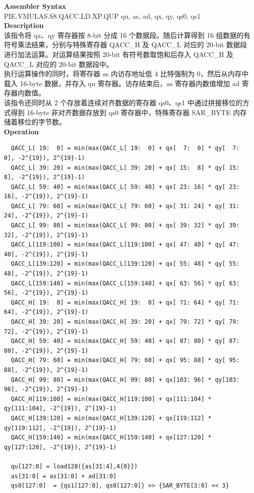 \textbf{Assembler Syntax} \\
PIE.VMULAS.S8.QACC.LD.XP.QUP qu, as, ad, qx, qy, qs0, qs1 \\
\textbf{Description} \\
该指令将 qx、qy 寄存器按 8-bit 分成 16 个数据段。随后计算得到 16 组数据的有符号乘法结果，分别与特殊寄存器 QACC\_H 及 QACC\_L 对应的 20-bit 数据段进行加法运算。对运算结果按照 20-bit 有符号数取饱和后存入 QACC\_H 及 QACC\_L 对应的 20-bit 数据段中。\\
执行运算操作的同时，将寄存器 as 内访存地址低 4 比特强制为 0，然后从内存中载入 16-byte 数据，并存入 qu 寄存器。访存结束后，as 寄存器内数值增加 ad 寄存器内数值。\\
该指令还同时从 2 个存放着连续对齐数据的寄存器 qs0、qs1 中通过拼接移位的方式得到 16-byte 非对齐数据存放到 qs0 寄存器中，特殊寄存器 SAR\_BYTE 内存储着移位的字节数。\\
\textbf{Operation}
\begin{lstlisting}
  QACC_L[ 19:  0] = min(max(QACC_L[ 19:  0] + qx[  7:  0] * qy[  7:  0], -2^{19}), 2^{19}-1)
  QACC_L[ 39: 20] = min(max(QACC_L[ 39: 20] + qx[ 15:  8] * qy[ 15:  8], -2^{19}), 2^{19}-1)
  QACC_L[ 59: 40] = min(max(QACC_L[ 59: 40] + qx[ 23: 16] * qy[ 23: 16], -2^{19}), 2^{19}-1)
  QACC_L[ 79: 60] = min(max(QACC_L[ 79: 60] + qx[ 31: 24] * qy[ 31: 24], -2^{19}), 2^{19}-1)
  QACC_L[ 99: 80] = min(max(QACC_L[ 99: 80] + qx[ 39: 32] * qy[ 39: 32], -2^{19}), 2^{19}-1)
  QACC_L[119:100] = min(max(QACC_L[119:100] + qx[ 47: 40] * qy[ 47: 40], -2^{19}), 2^{19}-1)
  QACC_L[139:120] = min(max(QACC_L[139:120] + qx[ 55: 48] * qy[ 55: 48], -2^{19}), 2^{19}-1)
  QACC_L[159:140] = min(max(QACC_L[159:140] + qx[ 63: 56] * qy[ 63: 56], -2^{19}), 2^{19}-1)
  QACC_H[ 19:  0] = min(max(QACC_H[ 19:  0] + qx[ 71: 64] * qy[ 71: 64], -2^{19}), 2^{19}-1)
  QACC_H[ 39: 20] = min(max(QACC_H[ 39: 20] + qx[ 79: 72] * qy[ 79: 72], -2^{19}), 2^{19}-1)
  QACC_H[ 59: 40] = min(max(QACC_H[ 59: 40] + qx[ 87: 80] * qy[ 87: 80], -2^{19}), 2^{19}-1)
  QACC_H[ 79: 60] = min(max(QACC_H[ 79: 60] + qx[ 95: 88] * qy[ 95: 88], -2^{19}), 2^{19}-1)
  QACC_H[ 99: 80] = min(max(QACC_H[ 99: 80] + qx[103: 96] * qy[103: 96], -2^{19}), 2^{19}-1)
  QACC_H[119:100] = min(max(QACC_H[119:100] + qx[111:104] * qy[111:104], -2^{19}), 2^{19}-1)
  QACC_H[139:120] = min(max(QACC_H[139:120] + qx[119:112] * qy[119:112], -2^{19}), 2^{19}-1)
  QACC_H[159:140] = min(max(QACC_H[159:140] + qx[127:120] * qy[127:120], -2^{19}), 2^{19}-1)

  qu[127:0] = load128({as[31:4],4{0}})
  as[31:0] = as[31:0] + ad[31:0]
  qs0[127:0]  = {qs1[127:0], qs0[127:0]} >> {SAR_BYTE[3:0] << 3}
\end{lstlisting}

